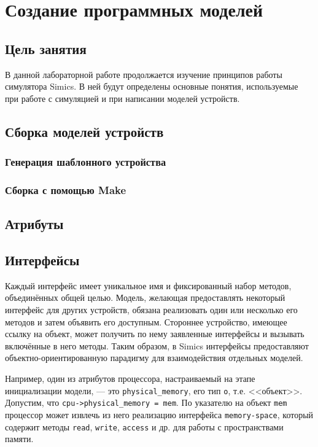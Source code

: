 \chapter{Создание программных моделей}\label{chap:lab-model-builder}

\section{Цель занятия}

В данной лабораторной работе продолжается изучение принципов работы симулятора Simics. В ней будут определены основные понятия, используемые при работе с симуляцией и при написании моделей устройств.

\section{Сборка моделей устройств}

\subsection{Генерация шаблонного устройства}

\subsection{Сборка с помощью Make}



\section{Атрибуты}

\section{Интерфейсы}

Каждый интерфейс имеет уникальное имя и фиксированный набор методов, объединённых общей целью. Модель, желающая предоставлять некоторый интерфейс для других устройств, обязана реализовать один или несколько его методов и затем объявить его доступным. Стороннее устройство, имеющее ссылку на объект, может получить по нему заявленные интерфейсы и вызывать включённые в него методы. Таким образом, в Simics интерфейсы предоставляют объектно-ориентированную парадигму для взаимодействия отдельных моделей. 

Например, один из атрибутов процессора, настраиваемый на этапе инициализации модели, --- это \texttt{physical_memory}, его тип \texttt{o}, т.е. <<объект>>. Допустим, что \texttt{cpu->physical_memory = mem}. По указателю на объект \texttt{mem} процессор может извлечь из него реализацию интерфейса \texttt{memory-space}, который содержит методы \texttt{read}, \texttt{write}, \texttt{access} и др. для работы с пространствами памяти.

